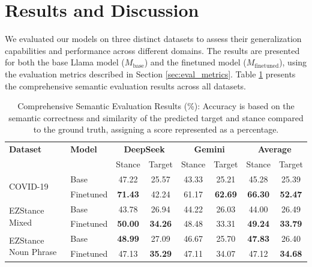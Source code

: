 \documentclass[twocolumn,11pt,letterpaper]{article}
\begin{document}
\section{Results and Discussion}
\label{sec:results}

We evaluated our models on three distinct datasets to assess their generalization capabilities and performance across different domains. The results are presented for both the base Llama model ($M_{\text{base}}$) and the finetuned model ($M_{\text{finetuned}}$), using the evaluation metrics described in Section \ref{sec:eval_metrics}. 
Table \ref{tab:combined_results} presents the comprehensive semantic evaluation results across all datasets.

\begin{table}[!htbp]
\centering
\caption{Comprehensive Semantic Evaluation Results (\%): Accuracy is based on the semantic correctness and similarity of the predicted target and stance compared to the ground truth, assigning a score represented as a percentage.}
\label{tab:combined_results}
\begin{tabular}{@{}llcccccc@{}}
\toprule
\textbf{Dataset} & \textbf{Model} & \multicolumn{2}{c}{\textbf{DeepSeek}} & \multicolumn{2}{c}{\textbf{Gemini}} & \multicolumn{2}{c}{\textbf{Average}} \\
\cmidrule(lr){3-4} \cmidrule(lr){5-6} \cmidrule(lr){7-8}
& & Stance & Target & Stance & Target & Stance & Target \\
\midrule
\multirow{2}{*}{COVID-19} 
& Base & 47.22 & 25.57 & 43.33 & 25.21 & 45.28 & 25.39 \\
& Finetuned & \textbf{71.43} & 42.24 & 61.17 & \textbf{62.69} & \textbf{66.30} & \textbf{52.47} \\
\midrule
\multirow{2}{*}{EZStance Mixed} 
& Base & 43.78 & 26.94 & 44.22 & 26.03 & 44.00 & 26.49 \\
& Finetuned & \textbf{50.00} & \textbf{34.26} & 48.48 & 33.31 & \textbf{49.24} & \textbf{33.79} \\
\midrule
\multirow{2}{*}{EZStance Noun Phrase} 
& Base & \textbf{48.99} & 27.09 & 46.67 & 25.70 & \textbf{47.83} & 26.40 \\
& Finetuned & 47.13 & \textbf{35.29} & 47.11 & 34.07 & 47.12 & \textbf{34.68} \\
\bottomrule
\end{tabular}
\end{table}
\end{document}
